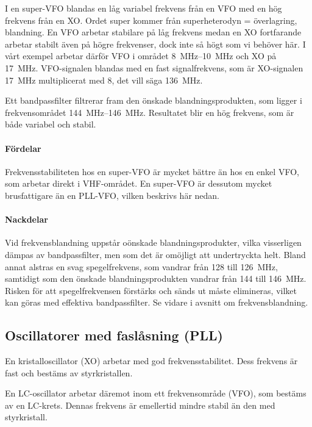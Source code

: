 I en super-VFO blandas en låg variabel frekvens från en VFO med en hög
frekvens från en XO.
Ordet super kommer från superheterodyn = överlagring, blandning.
En VFO arbetar stabilare på låg frekvens medan en XO fortfarande arbetar
stabilt även på högre frekvenser, dock inte så högt som vi behöver här.
I vårt exempel arbetar därför VFO i området \SIrange{8}{10}{\mega\hertz} och XO
på \SI{17}{\mega\hertz}.
VFO-signalen blandas med en fast signalfrekvens, som är XO-signalen
\SI{17}{\mega\hertz} multiplicerat med 8, det vill säga \SI{136}{\mega\hertz}.

Ett bandpassfilter filtrerar fram den önskade blandningsprodukten, som
ligger i frekvensområdet \SIrange{144}{146}{\mega\hertz}.
Resultatet blir en hög frekvens, som är både variabel och stabil.

\paragraph{Fördelar}
Frekvensstabiliteten hos en super-VFO är mycket bättre än hos en enkel VFO,
som arbetar direkt i VHF-området.
En super-VFO är dessutom mycket brusfattigare än en PLL-VFO, vilken
beskrivs här nedan.

\paragraph{Nackdelar}
Vid frekvensblandning uppstår oönskade blandningsprodukter, vilka visserligen
dämpas av bandpassfilter, men som det är omöjligt att undertryckta helt.
Bland annat alstras en svag spegelfrekvens, som vandrar från 128 till
\SI{126}{\mega\hertz}, samtidigt som den önskade blandningsprodukten vandrar
från 144 till \SI{146}{\mega\hertz}.
Risken för att spegelfrekvensen förstärks och sänds ut måste elimineras, vilket
kan göras med effektiva bandpassfilter.
Se vidare i avsnitt  om frekvensblandning.


\subsection{Oscillatorer med faslåsning (PLL)}
\label{PLL}

En kristalloscillator (XO) arbetar med god frekvensstabilitet.
Dess frekvens är fast och bestäms av styrkristallen.

En LC-oscillator arbetar däremot inom ett frekvensområde (VFO), som bestäms av
en LC-krets.
Dennas frekvens är emellertid mindre stabil än den med styrkristall.

